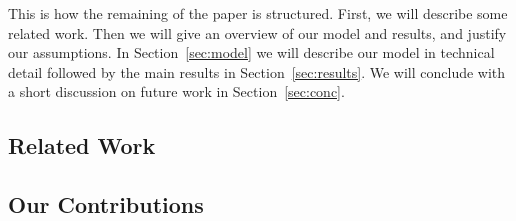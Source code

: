 This is how the remaining of the paper is structured. First, we will describe some related work. Then we will give an overview of our model and results, and justify our assumptions. 
In Section~\ref{sec:model} we will describe our model in technical detail followed by the main results in Section~\ref{sec:results}. 
We will conclude with a short discussion on future work in Section~\ref{sec:conc}.

\subsection{Related Work}


\subsection{Our Contributions}


